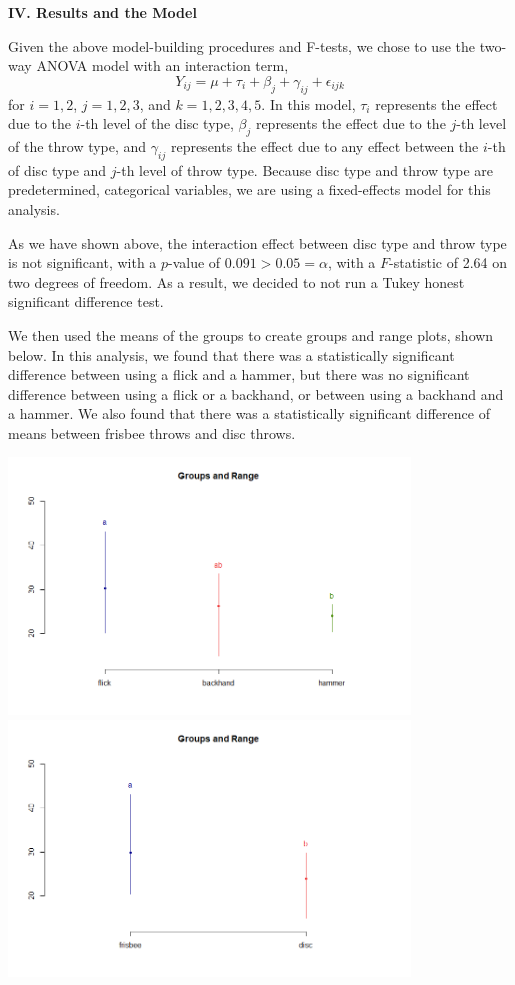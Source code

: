 \documentclass[letter,12pt]{article}
\begin{document}
	\begin{center}
		\textbf{IV. Results and the Model}
	\end{center}
	\justify
	Given the above model-building procedures and F-tests, we chose to use the two-way ANOVA model with an interaction term,
	$$Y_{ij} = \mu + \tau_{i} + \beta_{j} + \gamma_{ij} + \epsilon_{ijk}$$
	for $i = 1, 2$, $j = 1, 2, 3$, and $k=1, 2, 3, 4, 5$. In this model, $\tau_{i}$ represents the effect due to the $i$-th level of the disc type, $\beta_{j}$ represents the effect due to the $j$-th level of the throw type, and $\gamma_{ij}$ represents the effect due to any effect between the $i$-th of disc type and $j$-th level of throw type. Because disc type and throw type are predetermined, categorical variables, we are using a fixed-effects model for this analysis.\par
	As we have shown above, the interaction effect between disc type and throw type is not significant, with a $p$-value of $0.091 > 0.05 = \alpha$, with a $F$-statistic of 2.64 on two degrees of freedom. As a result, we decided to not run a Tukey honest significant difference test. \par
	We then used the means of the groups to create groups and range plots, shown below. In this analysis, we found that there was a statistically significant difference between using a flick and a hammer, but there was no significant difference between using a flick or a backhand, or between using a backhand and a hammer. We also found that there was a statistically significant difference of means between frisbee throws and disc throws.\par
	\begin{center}
    \includegraphics[width=0.8\textwidth]{grouprangethrow.png}
    \includegraphics[width=0.8\textwidth]{grouprangedisc.png}
  \end{center}
\end{document}
